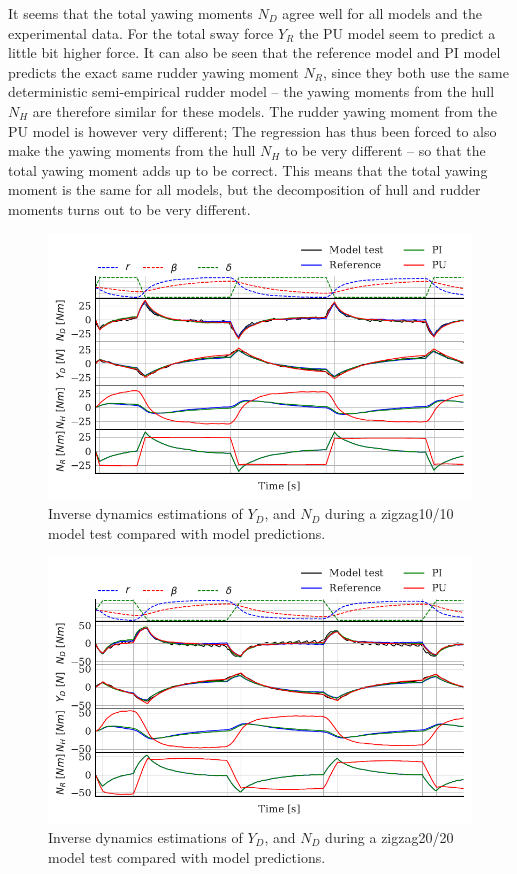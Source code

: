 It seems that the total yawing moments $N_D$ agree well for all models and the experimental data. For the total sway force $Y_R$ the PU model seem to predict a little bit higher force.  
It can also be seen that the reference model and PI model predicts the exact same rudder yawing moment $N_R$, since they both use the same deterministic semi-empirical rudder model -- the yawing moments from the hull $N_H$ are therefore similar for these models. The rudder yawing moment from the PU model is however very different; The regression has thus been forced to also make the yawing moments from the hull $N_H$ to be very different -- so that the total yawing moment adds up to be correct. This means that the total yawing moment is the same for all models, but the decomposition of hull and rudder moments turns out to be very different.
\begin{figure}[h]
    \centering
    \includegraphics{figures/results.ID_zigzag10.pdf}
    \caption{Inverse dynamics estimations of $Y_D$, and $N_D$ during a zigzag10/10 model test compared with model predictions.}
    \label{fig:ID_zigzag10}
\end{figure}
\begin{figure}[h]
    \centering
    \includegraphics{figures/results.ID_zigzag20.pdf}
    \caption{Inverse dynamics estimations of $Y_D$, and $N_D$ during a zigzag20/20 model test compared with model predictions.}
    \label{fig:ID_zigzag20}
\end{figure}
